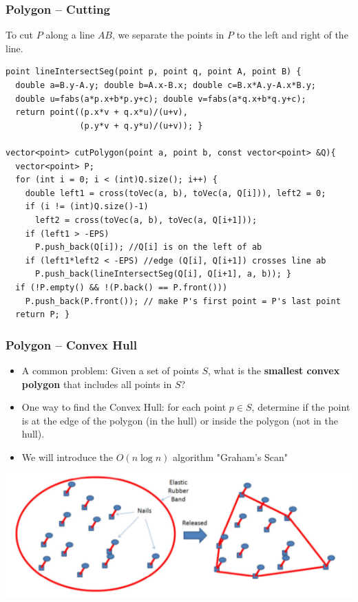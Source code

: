 \begin{frame}[fragile]
  \frametitle{Polygon -- Cutting}
  {\smaller
    \begin{block}{}
      To cut $P$ along a line $AB$, we separate the points in $P$ to the
      left and right of the line.
    \end{block}

{\smaller
    \begin{exampleblock}{}
\begin{verbatim}
point lineIntersectSeg(point p, point q, point A, point B) {
  double a=B.y-A.y; double b=A.x-B.x; double c=B.x*A.y-A.x*B.y;
  double u=fabs(a*p.x+b*p.y+c); double v=fabs(a*q.x+b*q.y+c);
  return point((p.x*v + q.x*u)/(u+v),
               (p.y*v + q.y*u)/(u+v)); }

vector<point> cutPolygon(point a, point b, const vector<point> &Q){
  vector<point> P;
  for (int i = 0; i < (int)Q.size(); i++) {
    double left1 = cross(toVec(a, b), toVec(a, Q[i])), left2 = 0;
    if (i != (int)Q.size()-1)
      left2 = cross(toVec(a, b), toVec(a, Q[i+1]));
    if (left1 > -EPS)
      P.push_back(Q[i]); //Q[i] is on the left of ab
    if (left1*left2 < -EPS) //edge (Q[i], Q[i+1]) crosses line ab
      P.push_back(lineIntersectSeg(Q[i], Q[i+1], a, b)); }
  if (!P.empty() && !(P.back() == P.front()))
    P.push_back(P.front()); // make P's first point = P's last point
  return P; }
\end{verbatim}
    \end{exampleblock}}
  }
\end{frame}

\begin{frame}
  \frametitle{Polygon -- Convex Hull}

  \begin{itemize}
    \item A common problem: Given a set of points $S$, what is the {\bf smallest convex polygon} that includes all points in $S$?\bigskip

    \item One way to find the Convex Hull: for each point $p \in S$, determine if the point is at the edge of the polygon (in the hull) or inside the polygon (not in the hull).\bigskip

    \item We will introduce the $O(n\log n)$ algorithm "Graham's Scan"
  \end{itemize}

    \begin{center}
      \includegraphics[width=.8\textwidth]{../img/convexhull_halim}
    \end{center}
\end{frame}


